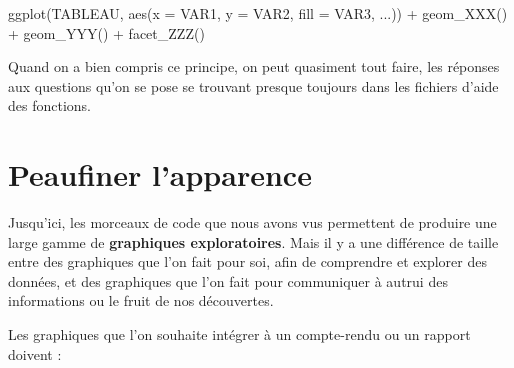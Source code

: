 \documentclass[
  a4paper,
  DIV=11,
  numbers=noendperiod,
  oneside]{scrreprt}
\newenvironment{Shaded}{}{}
\newcommand{\AttributeTok}[1]{\textcolor[rgb]{0.84,0.23,0.29}{#1}}
\newcommand{\FunctionTok}[1]{\textcolor[rgb]{0.44,0.26,0.76}{#1}}
\newcommand{\NormalTok}[1]{\textcolor[rgb]{0.14,0.16,0.18}{#1}}
\newcommand{\SpecialCharTok}[1]{\textcolor[rgb]{0.00,0.36,0.77}{#1}}
\begin{document}
\begin{tcolorbox}[enhanced jigsaw, coltitle=black, toprule=.15mm, opacityback=0, breakable, colback=white, opacitybacktitle=0.6, colframe=quarto-callout-important-color-frame, leftrule=.75mm, rightrule=.15mm, titlerule=0mm, bottomtitle=1mm, toptitle=1mm, arc=.35mm, title=\textcolor{quarto-callout-important-color}{\faExclamation}\hspace{0.5em}{Important}, colbacktitle=quarto-callout-important-color!10!white, bottomrule=.15mm, left=2mm]

\begin{Shaded}
\begin{Highlighting}[]
\FunctionTok{ggplot}\NormalTok{(TABLEAU, }\FunctionTok{aes}\NormalTok{(}\AttributeTok{x =}\NormalTok{ VAR1, }\AttributeTok{y =}\NormalTok{ VAR2, }\AttributeTok{fill =}\NormalTok{ VAR3, ...)) }\SpecialCharTok{+}
  \FunctionTok{geom\_XXX}\NormalTok{() }\SpecialCharTok{+}
  \FunctionTok{geom\_YYY}\NormalTok{() }\SpecialCharTok{+}
  \FunctionTok{facet\_ZZZ}\NormalTok{()}
\end{Highlighting}
\end{Shaded}

\end{tcolorbox}

Quand on a bien compris ce principe, on peut quasiment tout faire, les
réponses aux questions qu'on se pose se trouvant presque toujours dans
les fichiers d'aide des fonctions.

\section{Peaufiner l'apparence}\label{peaufiner-lapparence}

Jusqu'ici, les morceaux de code que nous avons vus permettent de
produire une large gamme de \textbf{graphiques exploratoires}. Mais il y
a une différence de taille entre des graphiques que l'on fait pour soi,
afin de comprendre et explorer des données, et des graphiques que l'on
fait pour communiquer à autrui des informations ou le fruit de nos
découvertes.

Les graphiques que l'on souhaite intégrer à un compte-rendu ou un
rapport doivent :
\end{document}
